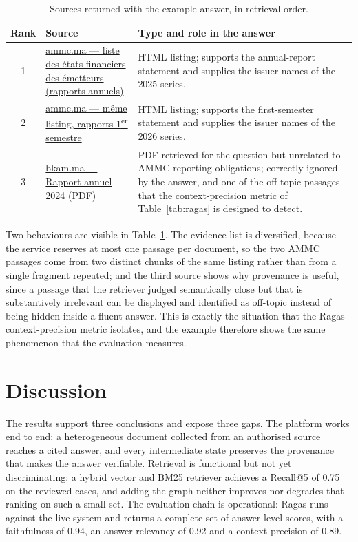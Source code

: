 \begin{table}[H]
\centering
\small
\setlength{\tabcolsep}{5pt}
\renewcommand{\arraystretch}{1.25}
\begin{tabularx}{\textwidth}{@{}c>{\raggedright\arraybackslash}p{4.9cm}X@{}}
\toprule
\rowcolor{lightblue}
\textbf{Rank} & \textbf{Source} & \textbf{Type and role in the answer} \\
\midrule
1 & \href{https://www.ammc.ma/fr/liste-etats-financiers-emetteurs}{ammc.ma --- liste des \'etats financiers des \'emetteurs (rapports annuels)} & HTML listing; supports the annual-report statement and supplies the issuer names of the 2025 series. \\
2 & \href{https://www.ammc.ma/fr/liste-etats-financiers-emetteurs}{ammc.ma --- m\^eme listing, rapports 1\textsuperscript{er} semestre} & HTML listing; supports the first-semester statement and supplies the issuer names of the 2026 series. \\
3 & \href{https://www.bkam.ma/content/download/829011/9037410/Rapport\%2024\%20FR.pdf}{bkam.ma --- Rapport annuel 2024 (PDF)} & PDF retrieved for the question but unrelated to AMMC reporting obligations; correctly ignored by the answer, and one of the off-topic passages that the context-precision metric of Table~\ref{tab:ragas} is designed to detect. \\
\bottomrule
\end{tabularx}
\caption{Sources returned with the example answer, in retrieval order.}
\label{tab:example-sources}
\end{table}

Two behaviours are visible in Table~\ref{tab:example-sources}. The evidence list is diversified, because the service reserves at most one passage per document, so the two AMMC passages come from two distinct chunks of the same listing rather than from a single fragment repeated; and the third source shows why provenance is useful, since a passage that the retriever judged semantically close but that is substantively irrelevant can be displayed and identified as off-topic instead of being hidden inside a fluent answer. This is exactly the situation that the Ragas context-precision metric isolates, and the example therefore shows the same phenomenon that the evaluation measures.

\section{Discussion}
\label{sec:discussion}
The results support three conclusions and expose three gaps. The platform works end to end: a heterogeneous document collected from an authorised source reaches a cited answer, and every intermediate state preserves the provenance that makes the answer verifiable. Retrieval is functional but not yet discriminating: a hybrid vector and BM25 retriever achieves a Recall@5 of 0.75 on the reviewed cases, and adding the graph neither improves nor degrades that ranking on such a small set. The evaluation chain is operational: Ragas runs against the live system and returns a complete set of answer-level scores, with a faithfulness of 0.94, an answer relevancy of 0.92 and a context precision of 0.89.

